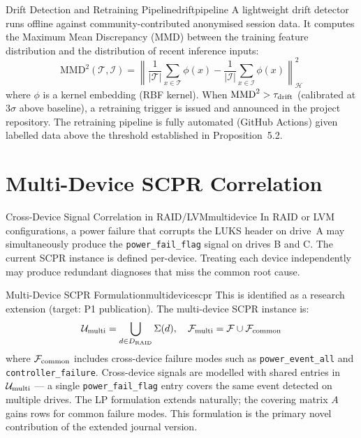 \documentclass[11pt,a4paper]{report}
\newcommand{\calU}{\mathcal{U}}
\newcommand{\calF}{\mathcal{F}}
\begin{document}
\begin{solution}{Drift Detection and Retraining Pipeline}{driftpipeline}
A lightweight drift detector runs offline against community-contributed anonymised session data. It computes the Maximum Mean Discrepancy (MMD) between the training feature distribution and the distribution of recent inference inputs:
\[
  \mathrm{MMD}^2(\mathcal{T}, \mathcal{I}) = \left\| \frac{1}{|\mathcal{T}|}\sum_{x \in \mathcal{T}} \phi(x) - \frac{1}{|\mathcal{I}|}\sum_{x \in \mathcal{I}} \phi(x) \right\|_{\mathcal{H}}^2
\]
where $\phi$ is a kernel embedding (RBF kernel). When $\mathrm{MMD}^2 > \tau_{\rm drift}$ (calibrated at $3\sigma$ above baseline), a retraining trigger is issued and announced in the project repository. The retraining pipeline is fully automated (GitHub Actions) given labelled data above the threshold established in Proposition~5.2.
\end{solution}

\section{Multi-Device SCPR Correlation}

\begin{edgecase}{Cross-Device Signal Correlation in RAID/LVM}{multidevice}
In RAID or LVM configurations, a power failure that corrupts the LUKS header on drive~A may simultaneously produce the \texttt{power\_fail\_flag} signal on drives B and C. The current SCPR instance is defined per-device. Treating each device independently may produce redundant diagnoses that miss the common root cause.
\end{edgecase}

\begin{solution}{Multi-Device SCPR Formulation}{multidevicescpr}
This is identified as a research extension (target: P1 publication). The multi-device SCPR instance is:
\[
  \calU_{\rm multi} = \bigcup_{d \in D_{\rm RAID}} \Sigma(d), \quad \calF_{\rm multi} = \calF \cup \calF_{\rm common}
\]
where $\calF_{\rm common}$ includes cross-device failure modes such as \texttt{power\_event\_all} and \texttt{controller\_failure}. Cross-device signals are modelled with shared entries in $\calU_{\rm multi}$ --- a single \texttt{power\_fail\_flag} entry covers the same event detected on multiple drives. The LP formulation extends naturally; the covering matrix $A$ gains rows for common failure modes. This formulation is the primary novel contribution of the extended journal version.
\end{solution}
\end{document}
